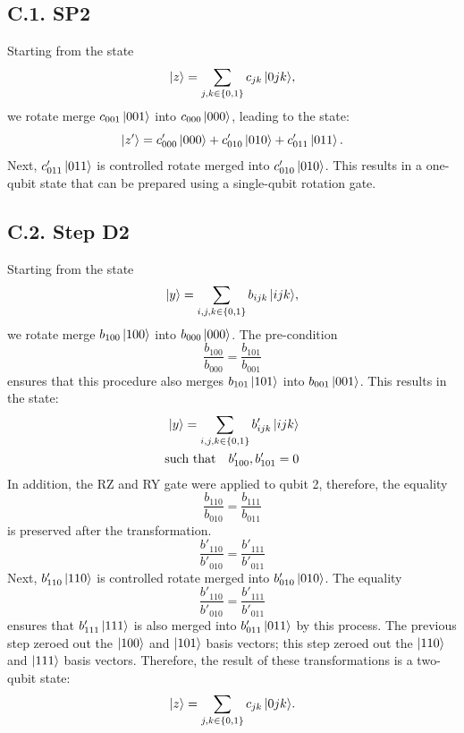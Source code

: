 \subsection*{C.1. SP2}
Starting from the state 
\begin{equation}
\mathinner{|{z}\rangle} = \sum_{j, k \in \{0, 1\}}{c_{jk}\mathinner{|{0jk}\rangle}},
\end{equation}
we rotate merge $c_{001}\mathinner{|{001}\rangle}$ into $c_{000}\mathinner{|{000}\rangle}$, leading to the state:
\begin{equation}
\mathinner{|{z'}\rangle} = c'_{000}\mathinner{|{000}\rangle} + c'_{010}\mathinner{|{010}\rangle} + c'_{011}\mathinner{|{011}\rangle}.
\end{equation}
Next, $c'_{011}\mathinner{|{011}\rangle}$ is controlled rotate merged into $c'_{010}\mathinner{|{010}\rangle}$. This
results in a one-qubit state that can be prepared using a single-qubit rotation gate.

\subsection*{C.2. Step D2}
Starting from the state
\begin{equation}
\mathinner{|{y}\rangle} = \sum_{i, j, k \in \{0, 1\}}{b_{ijk}\mathinner{|{ijk}\rangle}},
\end{equation}
 we rotate merge $b_{100}\mathinner{|{100}\rangle}$ into $b_{000}\mathinner{|{000}\rangle}$. The pre-condition
\begin{equation}
\frac{b_{100}}{b_{000}} = \frac{b_{101}}{b_{001}}
\end{equation}
ensures that this procedure also merges $b_{101}\mathinner{|{101}\rangle}$ into $b_{001}\mathinner{|{001}\rangle}$.
This results in the state:
\begin{align}
\mathinner{|{y}\rangle} = \sum_{i, j, k \in \{0, 1\}}{b'_{ijk}\mathinner{|{ijk}\rangle}} \nonumber \\
\text{such that} \quad b'_{100}, b'_{101} = 0
\end{align}
In addition, the RZ and RY gate were applied to qubit 2, therefore, the equality
\begin{equation}
\frac{b_{110}}{b_{010}} = \frac{b_{111}}{b_{011}}
\end{equation}
is preserved after the transformation.
\begin{equation}
\frac{b'_{110}}{b'_{010}} = \frac{b'_{111}}{b'_{011}}
\end{equation}
Next, $b'_{110}\mathinner{|{110}\rangle}$ is controlled rotate merged into $b'_{010}\mathinner{|{010}\rangle}$. The
equality
\begin{equation}
\frac{b'_{110}}{b'_{010}} = \frac{b'_{111}}{b'_{011}}
\end{equation}
ensures that $b'_{111}\mathinner{|{111}\rangle}$ is also merged into $b'_{011}\mathinner{|{011}\rangle}$ by this
process. The previous step zeroed out the $\mathinner{|{100}\rangle}$ and $\mathinner{|{101}\rangle}$ basis vectors;
this step zeroed out the $\mathinner{|{110}\rangle}$ and $\mathinner{|{111}\rangle}$ basis vectors. Therefore, the
result of these transformations is a two-qubit state:
\begin{equation}
\mathinner{|{z}\rangle} = \sum_{j, k \in \{0, 1\}}{c_{jk}\mathinner{|{0jk}\rangle}}.
\end{equation}
